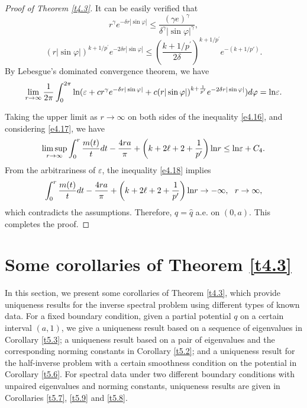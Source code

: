 \documentclass[reqno,12pt,centertags]{amsart}
\renewcommand{\ln}{\text{\rm ln}}
\numberwithin{equation}{section}
\theoremstyle{definition}
\begin{document}
\begin{proof}[Proof of Theorem \ref{t4.3}]
It can be easily verified that
$$ r^{\gamma}e^{-\delta r|\sin \varphi|}\leq\frac{(\gamma e)^{\gamma}}{\delta^{\gamma}|\sin\varphi|^{\gamma}},$$
$$(r|\sin\varphi|)^{k+1/p^{\prime}}e^{-2\delta r|\sin\varphi|} \leq \left(\frac{k+1/p^{\prime}}{2\delta}\right)^{k+1/p^{\prime}} e^{-(k+1/p')}.$$
By Lebesgue's dominated convergence theorem, we have
\begin{equation}\label{e4.17}
\lim_{r\rightarrow\infty}\frac{1}{2\pi} 
\int_{0}^{2 \pi} 
\ln (\varepsilon+cr^{\gamma}e^{-\delta r|\sin \varphi|}
+c(r|\sin \varphi|)^{k+\frac{1}{p^{\prime}}}
e^{-2\delta r|\sin \varphi|})
d\varphi
=\ln \varepsilon.
\end{equation}

Taking the upper limit as $r\rightarrow\infty$ on both sides of the inequality \eqref{e4.16}, and considering \eqref{e4.17}, we have
\begin{equation}\label{e4.18}
\limsup_{r\rightarrow\infty}\int_{0}^{r}\frac{m(t)}{t}dt
-\frac{4ra}{\pi}+\left(k+2\ell+2+\frac{1}{p^{\prime}}\right)\ln r 
\leq\ln\varepsilon+C_4.
\end{equation}
From the arbitrariness of $\varepsilon$, the inequality \eqref{e4.18} implies 
\begin{align*}
\int_{0}^{r}\frac{m(t)}{t}dt
-\frac{4ra}{\pi}
+\left(k+2 \ell+2+\frac{1}{p^{\prime}}\right)\ln r 
\rightarrow-\infty, 
~~r\rightarrow\infty,
\end{align*}
which contradicts the assumptions. Therefore, $q=\hat{q}$ a.e. on $(0,a)$. This completes the proof.
\end{proof}

\section{Some corollaries of Theorem \ref{t4.3}}\label{s5}


In this section, we present some corollaries of Theorem \ref{t4.3}, which provide uniqueness results for the inverse spectral problem using different types of known data. For a fixed boundary condition, given a partial potential $q$ on a certain interval $(a,1)$, we give a uniqueness result based on a sequence of eigenvalues in Corollary \ref{t5.3}; a uniqueness result based on a pair of eigenvalues and the corresponding norming constants in Corollary \ref{t5.2}; and a uniqueness result for the half-inverse problem with a certain smoothness condition on the potential in Corollary \ref{t5.6}. For spectral data under two different boundary conditions with unpaired eigenvalues and norming constants, uniqueness results are given in Corollaries  \ref{t5.7}, \ref{t5.9} and \ref{t5.8}.  
\end{document}
